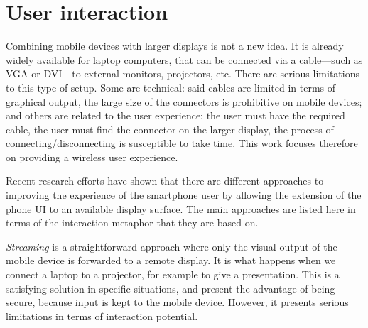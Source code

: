 
\section{User interaction}
\label{sec:rwinteraction}


Combining mobile devices with larger displays is not a new idea.
It is already widely available for laptop computers, that can be connected via a cable---such as VGA or DVI---to external monitors, projectors, etc.
There are serious limitations to this type of setup.
Some are technical: said cables are limited in terms of graphical output, the large size of the connectors is prohibitive on mobile devices; and others are related to the user experience: the user must have the required cable, the user must find the connector on the larger display, the process of connecting/disconnecting is susceptible to take time.
This work focuses therefore on providing a wireless user experience.

Recent research efforts have shown that there are different approaches to improving the experience of the smartphone user by allowing the extension of the phone UI to an available display surface.
The main approaches are listed here in terms of the interaction metaphor that they are based on.

\emph{Streaming} is a straightforward approach where only the visual output of the mobile device is forwarded to a remote display.
It is what happens when we connect a laptop to a projector, for example to give a presentation.
This is a satisfying solution in specific situations, and present the advantage of being secure, because input is kept to the mobile device.
However, it presents serious limitations in terms of interaction potential.

